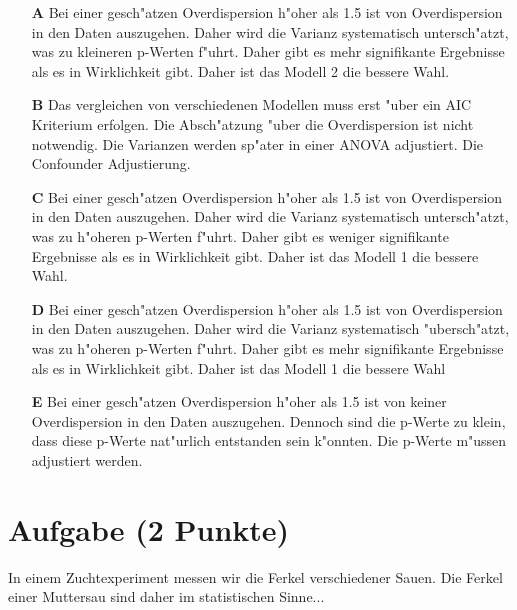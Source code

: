 \documentclass[a4paper, 10pt]{scrartcl}\usepackage[]{graphicx}\usepackage[]{color}
\begin{document}
\begin{enumerate}
\item [\textbf{A} \msquare] Bei einer gesch{"a}tzen Overdispersion h{"o}her als 1.5 ist von Overdispersion in den Daten auszugehen. Daher wird die Varianz systematisch untersch{"a}tzt, was zu kleineren p-Werten f{"u}hrt. Daher gibt es mehr signifikante Ergebnisse als es in Wirklichkeit gibt. Daher ist das Modell 2 die bessere Wahl.
\item [\textbf{B} \msquare] Das vergleichen von verschiedenen Modellen muss erst {"u}ber ein AIC Kriterium erfolgen. Die Absch{"a}tzung {"u}ber die Overdispersion ist nicht notwendig. Die Varianzen werden sp{"a}ter in einer ANOVA adjustiert. Die Confounder Adjustierung.
\item [\textbf{C} \msquare] Bei einer gesch{"a}tzen Overdispersion h{"o}her als 1.5 ist von Overdispersion in den Daten auszugehen. Daher wird die Varianz systematisch untersch{"a}tzt, was zu h{"o}heren p-Werten f{"u}hrt. Daher gibt es weniger signifikante Ergebnisse als es in Wirklichkeit gibt. Daher ist das Modell 1 die bessere Wahl.
\item [\textbf{D} \msquare] Bei einer gesch{"a}tzen Overdispersion h{"o}her als 1.5 ist von Overdispersion in den Daten auszugehen. Daher wird die Varianz systematisch {"u}bersch{"a}tzt, was zu h{"o}heren p-Werten f{"u}hrt. Daher gibt es mehr signifikante Ergebnisse als es in Wirklichkeit gibt. Daher ist das Modell 1 die bessere Wahl
\item [\textbf{E} \msquare] Bei einer gesch{"a}tzen Overdispersion h{"o}her als 1.5 ist von keiner Overdispersion in den Daten auszugehen. Dennoch sind die p-Werte zu klein, dass diese p-Werte nat{"u}rlich entstanden sein k{"o}nnten. Die p-Werte m{"u}ssen adjustiert werden.
\end{enumerate}

\section{Aufgabe \hfill (2 Punkte)}

In einem Zuchtexperiment messen wir die Ferkel verschiedener Sauen. Die
Ferkel einer Muttersau sind daher im statistischen Sinne... 
\end{document}
